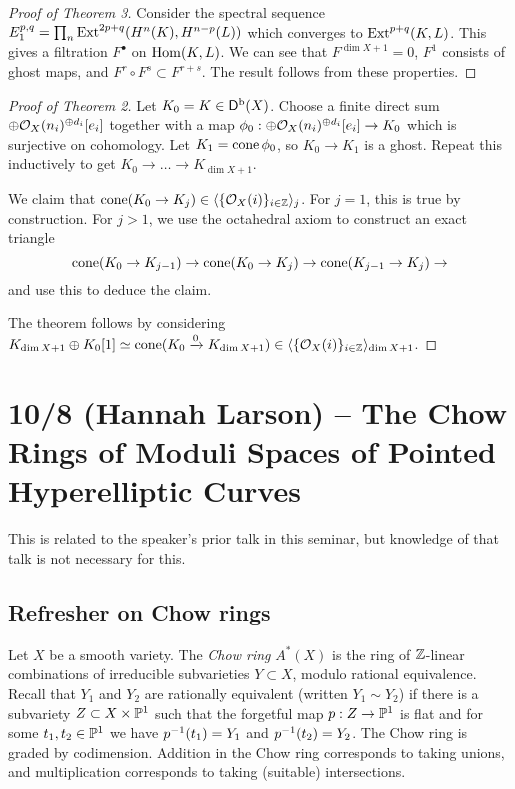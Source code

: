 \documentclass{amsart}
\begin{document}
\begin{proof}[Proof of Theorem 3]
	Consider the spectral sequence $E_1^{p,q} = \prod_n \operatorname{Ext}^{2p+q}(H^n(K), H^{n-p}(L))$ which converges to $\operatorname{Ext}^{p+q}(K, L)$.
	This gives a filtration $F^\bullet$ on $\operatorname{Hom}(K, L)$.
	We can see that $F^{\dim X + 1} = 0$, $F^1$ consists of ghost maps, and $F^r \circ F^s \subset F^{r+s}$.
	The result follows from these properties.
\end{proof}

\begin{proof}[Proof of Theorem 2]
	Let $K_0 = K \in \mathsf{D}^{\mathrm{b}}(X)$.
	Choose a finite direct sum $\oplus \mathcal{O}_X(n_i)^{\oplus d_i}[e_i]$ together with a map $\phi_0: \oplus \mathcal{O}_X(n_i)^{\oplus d_i}[e_i] \to K_0$ which is surjective on cohomology.
	Let $K_1 = \operatorname{cone} \phi_0$, so $K_0 \to K_1$ is a ghost.
	Repeat this inductively to get $K_0 \to \dots \to K_{\dim X + 1}$.
	
	We claim that $\operatorname{cone}(K_0 \to K_j) \in \langle {\{\mathcal{O}_X(i)\}_{i \in \mathbb{Z}}} \rangle_j$.
	For $j = 1$, this is true by construction.
	For $j > 1$, we use the octahedral axiom to construct an exact triangle
	\[
		\operatorname{cone}(K_0 \to K_{j-1}) \to \operatorname{cone}(K_0 \to K_j) \to \operatorname{cone}(K_{j-1} \to K_j) \to
	\]
	and use this to deduce the claim.

	The theorem follows by considering $K_{\dim X + 1} \oplus K_0[1] \simeq \operatorname{cone}(K_0 \xrightarrow{0} K_{\dim X + 1}) \in \langle {\{\mathcal{O}_X(i)\}_{i \in \mathbb{Z}}} \rangle_{\dim X + 1}$.
\end{proof}

\section{10/8 (Hannah Larson) -- The Chow Rings of Moduli Spaces of Pointed Hyperelliptic Curves}

This is related to the speaker's prior talk in this seminar, but knowledge of that talk is not necessary for this.

\subsection{Refresher on Chow rings}

Let $X$ be a smooth variety.
The \emph{Chow ring} $A^*(X)$ is the ring of $\mathbb{Z}$-linear combinations of irreducible subvarieties $Y \subset X$, modulo rational equivalence.
Recall that $Y_1$ and $Y_2$ are rationally equivalent (written $Y_1 \sim Y_2$) if there is a subvariety $Z \subset X \times \mathbb{P}^1$ such that the forgetful map $p: Z \to \mathbb{P}^1$ is flat and for some $t_1, t_2 \in \mathbb{P}^1$ we have $p^{-1}(t_1) = Y_1$ and $p^{-1}(t_2) = Y_2$.
The Chow ring is graded by codimension.
Addition in the Chow ring corresponds to taking unions, and multiplication corresponds to taking (suitable) intersections.
\end{document}
